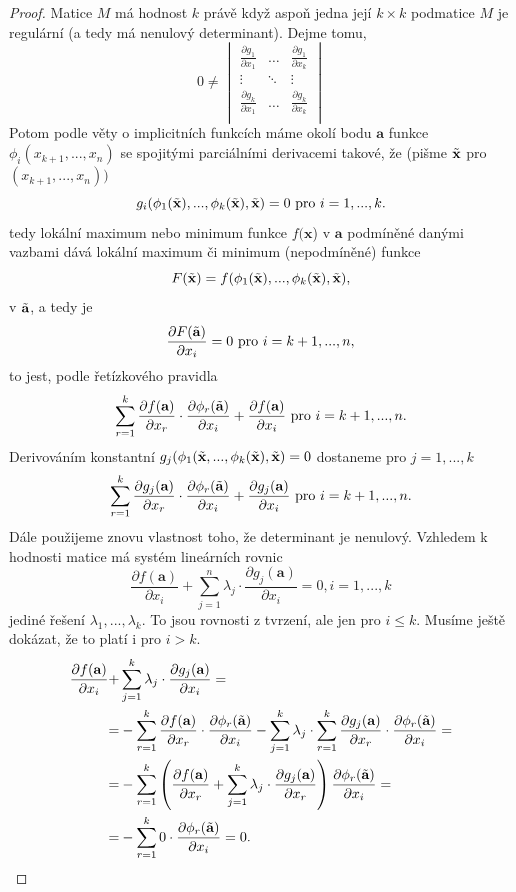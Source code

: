 \documentclass[../main.tex]{subfiles}
\begin{document}
\begin{proof}
	Matice $M$ má hodnost $k$ právě když aspoň jedna její $k\times k$ podmatice $M$ je regulární (a tedy má nenulový determinant). Dejme tomu,
	\[ 0 \neq \begin{vmatrix}
	\frac{\partial g_1}{\partial x_1} & \dots & \frac{\partial g_1}{\partial x_k}\\
	\vdots & \ddots & \vdots\\
	\frac{\partial g_k}{\partial x_1} & \dots & \frac{\partial g_k}{\partial x_k}\\
	\end{vmatrix}\]
	Potom podle věty o implicitních funkcích máme okolí bodu $\textbf{a}$ funkce $\phi_i(x_{k+1},...,x_n)$
	se spojitými parciálními derivacemi takové, že (pišme $\Tilde{\textbf{x}}$ pro $(x_{k+1},...,x_n))$
	\[g_i(\phi_1(\Tilde{\textbf{x}}),...,\phi_k(\Tilde{\textbf{x}}),\Tilde{\textbf{x}}) = 0 \text{ pro } i=1,...,k.\]
	tedy lokální maximum nebo minimum funkce $f(\textbf{x}$) v $\textbf{a}$ podmíněné danými vazbami dává lokální maximum či minimum (nepodmíněné) funkce
	\[F(\Tilde{\textbf{x}}) = f(\phi_1(\Tilde{\textbf{x}}),...,\phi_k(\Tilde{\textbf{x}}),\Tilde{\textbf{x}}),\]
	v $\Tilde{\textbf{a}}$, a tedy je 
	\[\frac{\partial F(\Tilde{\textbf{a}})}{\partial x_i} = 0 \text{ pro } i = k+1,...,n,\]
	to jest, podle řetízkového pravidla
	\[\sum^k_{r=1}\frac{\partial f(\textbf{a})}{\partial x_r}\cdot \frac{\partial \phi_r(\Tilde{\textbf{a}})}{\partial x_i} + \frac{\partial f(\textbf{a})}{\partial x_i} \text{ pro } i = k+1,...,n.\]
	Derivováním konstantní $g_j(\phi_1(\Tilde{\textbf{x}},...,\phi_k(\Tilde{\textbf{x}}),\Tilde{\textbf{x}}) = 0$ dostaneme pro $j = 1,...,k$
	\[\sum^k_{r=1}\frac{\partial g_j(\textbf{a})}{\partial x_r}\cdot \frac{\partial \phi_r(\Tilde{\textbf{a}})}{\partial x_i} + \frac{\partial g_j(\textbf{a})}{\partial x_i} \text{ pro } i = k+1,...,n.\]
	Dále použijeme znovu vlastnost toho, že determinant je nenulový. Vzhledem k hodnosti matice má systém lineárních rovnic
	\[\frac{\partial f(\textbf{a})}{\partial x_i} + \sum^n_{j=1}\lambda_j\cdot\frac{\partial g_j(\textbf{a})}{\partial x_i} = 0, i = 1,...,k\]
	jediné řešení $\lambda_1,...,\lambda_k.$ To jsou rovnosti z tvrzení, ale jen pro $i \leq k$. Musíme ještě dokázat, že to platí i pro $i > k$. 
	\begin{align*}
	\frac{\partial f(\textbf{a})}{\partial x_i} + & \sum^k_{j=1}\lambda_j\cdot\frac{\partial g_j(\textbf{a})}{\partial x_i}=\\
	= & - \sum^k_{r=1} \frac{\partial f(\textbf{a})}{\partial x_r}\cdot\frac{\partial \phi_r(\Tilde{\textbf{a}})}{\partial x_i} -
	\sum^k_{j=1}\lambda_j\cdot\sum^k_{r=1}\frac{\partial g_j(\textbf{a})}{\partial x_r}\cdot\frac{\partial \phi_r(\Tilde{\textbf{a}})}{\partial x_i} =\\
	= & - \sum^k_{r=1}\left(\frac{\partial f(\textbf{a})}{\partial x_r}+\sum^k_{j=1}\lambda_j\cdot\frac{\partial g_j(\textbf{a})}{\partial x_r}\right)\frac{\partial \phi_r(\Tilde{\textbf{a}})}{\partial x_i}=\\
	= & - \sum^k_{r=1}0\cdot\frac{\partial \phi_r(\Tilde{\textbf{a}})}{\partial x_i}=0.
	\end{align*}
\end{proof}
\end{document}
